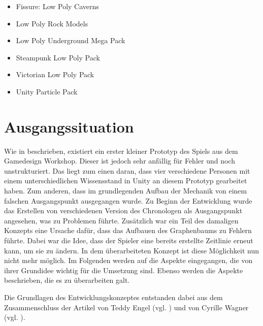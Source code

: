 \begin{itemize}  
    \item Fissure: Low Poly Caverns \cite{noauthor_fissure_nodate}
    \item Low Poly Rock Models \cite{noauthor_low_lprm}
    \item Low Poly Underground Mega Pack \cite{noauthor_low_nodate}
    \item Steampunk Low Poly Pack \cite{noauthor_steampunk_lp}
    \item Victorian Low Poly Pack \cite{noauthor_victorian_nodate}
    \item Unity Particle Pack \cite{noauthor_unity_nodate}
\end{itemize}


\section{Ausgangssituation}
Wie in  beschrieben, existiert ein erster kleiner Prototyp des Spiels aus dem Gamedesign Workshop. Dieser ist jedoch sehr anfällig für Fehler und noch unstrukturiert. Das liegt zum einen daran, dass vier verschiedene Personen mit einem unterschiedlichen Wissensstand in Unity an diesem Prototyp gearbeitet haben. Zum anderen, dass im grundlegenden Aufbau der Mechanik von einem falschen Ausgangspunkt ausgegangen wurde. Zu Beginn der Entwicklung wurde das Erstellen von verschiedenen Version des Chronologen als Ausgangspunkt angesehen, was zu Problemen führte. Zusätzlich war ein Teil des damaligen Konzepts eine Ursache dafür, dass das Aufbauen des Graphenbaums zu Fehlern führte. Dabei war die Idee, dass der Spieler eine bereits erstellte Zeitlinie erneut  kann, um sie zu ändern. In dem überarbeiteten Konzept ist diese Möglichkeit nun nicht mehr möglich. Im Folgenden werden auf die Aspekte eingegangen, die von ihrer Grundidee wichtig für die Umsetzung sind. Ebenso werden die  Aspekte beschrieben, die es zu überarbeiten galt.

Die Grundlagen des Entwicklungskonzeptes entstanden dabei aus dem Zusammenschluss der Artikel  von Teddy Engel (vgl. \cite{engel_creating_2020}) und   von Cyrille Wagner (vgl. \cite{wagner_developing_2004}).
